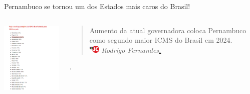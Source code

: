 \documentclass[compress,12pt]{beamer}
\begin{document}
\begin{frame}{Pernambuco se tornou um dos Estados mais caros do Brasil!}
\centering
    \begin{columns}
    
        \centering
        
        \includegraphics[width=5cm]{Imagens/Ranks de ICMS .png}
        
        \centering
        
        {\begin{tcolorbox}[newspaper] 
\begin{quote}
        \small
        \centering
        \vspace{0,5cm}
Aumento da atual governadora coloca Pernambuco como segundo maior ICMS do Brasil em 2024. \\
\textit{\includegraphics[width=5mm]{Imagens/logo-jc2.webp.png} Rodrigo Fernandes\href{https://jc.ne10.uol.com.br/colunas/jamildo/2023/10/15618251-aumento-de-raquel-lyra-coloca-pernambuco-como-segundo-maior-icms-do-brasil-em-2024-veja-o-ranking.html}{.}}
        \end{quote}.

        \end{tcolorbox}}
    \end{columns}
    
\end{frame}


\end{document}
